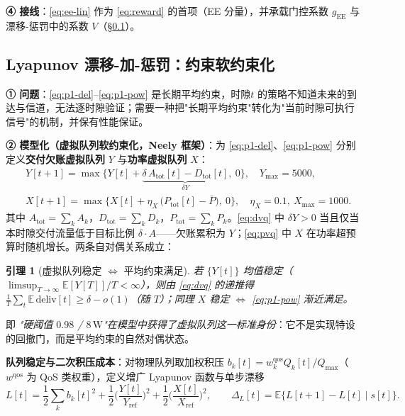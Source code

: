 \documentclass[UTF8,11pt,a4paper]{ctexart}
\theoremstyle{plain}
\newtheorem{lemma}[theorem]{引理}
\theoremstyle{definition}
\theoremstyle{remark}
\newcommand{\E}{\mathbb{E}}
\begin{document}
\textbf{④ 接线}：\eqref{eq:ee-lin} 作为 \eqref{eq:reward} 的首项（EE 分量），并承载门控系数 $g_{\mathrm{EE}}$ 与漂移-惩罚中的系数 $V$（\S\ref{sec:lyap}）。

\subsection{Lyapunov 漂移-加-惩罚：约束软约束化} \label{sec:lyap}

\textbf{① 问题}：\eqref{eq:p1-del}--\eqref{eq:p1-pow} 是长期平均约束，时隙$t$ 的策略不知道未来的到达与信道，无法逐时隙验证；需要一种把"长期平均约束"转化为"当前时隙可执行信号"的机制，并保有性能保证。

\textbf{② 模型化（虚拟队列软约束化，Neely 框架）}：为 \eqref{eq:p1-del}、\eqref{eq:p1-pow} 分别定义\textbf{交付欠账虚拟队列} $Y$ 与\textbf{功率虚拟队列} $X$：
\begin{align}
  &Y[t{+}1] = \max\big\{ Y[t] + \underbrace{\delta\,A_{\mathrm{tot}}[t] - D_{\mathrm{tot}}[t]}_{\delta Y},\ 0\big\}, \quad Y_{\max}=5000, \label{eq:dvq}\\
  &X[t{+}1] = \max\big\{ X[t] + \eta_X\,\big(P_{\mathrm{tot}}[t] - \bar P\big),\ 0\big\}, \quad \eta_X=0.1,\ X_{\max}=1000. \label{eq:pvq}
\end{align}
其中 $A_{\mathrm{tot}}=\sum_k A_k$，$D_{\mathrm{tot}}=\sum_k D_k$，$P_{\mathrm{tot}}=\sum_k P_k$。\eqref{eq:dvq} 中 $\delta Y>0$ 当且仅当本时隙交付流量低于目标比例 $\delta \cdot A$——欠账累积为 $Y$；\eqref{eq:pvq} 中 $X$ 在功率超预算时随机增长。两条自对偶关系成立：

\begin{lemma}[虚拟队列稳定 $\Leftrightarrow$ 平均约束满足]\label{lem:stab}
若 $\{Y[t]\}$ 均值稳定（$\limsup_{T\to\infty}\E[Y[T]]/T<\infty$），则由 \eqref{eq:dvq} 的递推得 $\frac{1}{T}\sum_t\E\,\mathrm{deliv}[t]\ge\delta-o(1)$（随 $T$）；同理 $X$ 稳定 $\Leftrightarrow$ \eqref{eq:p1-pow} 渐近满足。
\end{lemma}
即 \emph{"硬阈值 $0.98$ / $8\,\mathrm{W}$"在模型中获得了虚拟队列这一标准身份}：它不是实现特设的回撤门，而是平均约束的自然对偶状态。

\textbf{队列稳定与二次积压成本}：对物理队列取加权积压 $b_k[t]=w_k^{\mathrm{qos}}Q_k[t]/Q_{\max}$（$w^{\mathrm{qos}}$ 为 QoS 类权重），定义增广 Lyapunov 函数与单步漂移
\begin{equation}
  L[t] = \frac12\sum_k b_k[t]^2 + \frac12\Big(\frac{Y[t]}{Y_{\mathrm{ref}}}\Big)^2 + \frac12\Big(\frac{X[t]}{X_{\mathrm{ref}}}\Big)^2,\qquad
  \Delta_L[t] = \E\{ L[t{+}1] - L[t] \mid s[t] \}.
  \label{eq:lyap}
\end{equation}
\end{document}
